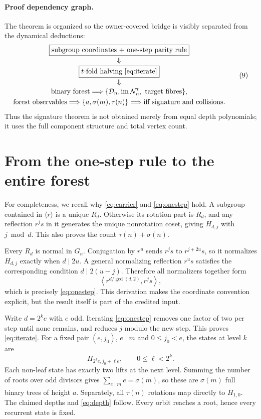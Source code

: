 \documentclass[10pt,a4paper]{amsart}
\theoremstyle{remark}
\newcommand{\im}{\operatorname{im}}
\begin{document}
\paragraph{Proof dependency graph.}
The theorem is organized so the owner-covered bridge is visibly separated
from the dynamical deductions:
\[
\begin{gathered}
\boxed{\text{subgroup coordinates + one-step parity rule}}\\[-1mm]
\Downarrow\\[-1mm]
\boxed{\text{\(t\)-fold halving \eqref{eq:iterate}}}\\[-1mm]
\Downarrow\\[-1mm]
\text{binary forest}\Longrightarrow
\{\mathcal D_n,\im\mathcal N_n^t,\text{ target fibres}\},\\
\text{forest observables}\Longrightarrow\{a,\sigma(m),\tau(n)\}
\Longrightarrow\text{iff signature and collisions}.
\end{gathered}                                         \tag{9}\label{eq:dependency}
\]
Thus the signature theorem is not obtained merely from equal depth
polynomials; it uses the full component structure and total vertex count.

\section{From the one-step rule to the entire forest}

For completeness, we recall why \eqref{eq:carrier} and \eqref{eq:onestep}
hold.  A subgroup contained in \(\langle r\rangle\) is a unique \(R_d\).
Otherwise its rotation part is \(R_d\), and any reflection \(r^js\) in it
generates the unique nonrotation coset, giving \(H_{d,j}\) with \(j\bmod d\).
This also proves the count \(\tau(n)+\sigma(n)\).

Every \(R_d\) is normal in \(G_n\).  Conjugation by \(r^u\) sends
\(r^js\) to \(r^{j+2u}s\), so it normalizes \(H_{d,j}\) exactly when
\(d\mid2u\).  A general normalizing reflection \(r^us\) satisfies the
corresponding condition \(d\mid2(u-j)\).  Therefore all normalizers together
form
\[
\left\langle r^{d/\gcd(d,2)},r^js\right\rangle,
\]
which is precisely \eqref{eq:onestep}.  This derivation makes the coordinate
convention explicit, but the result itself is part of the credited input.

Write \(d=2^ke\) with \(e\) odd.  Iterating \eqref{eq:onestep} removes one
factor of two per step until none remains, and reduces \(j\) modulo the new
step.  This proves \eqref{eq:iterate}.  For a fixed pair
\((e,j_0)\), \(e\mid m\) and \(0\leq j_0<e\), the states at level \(k\) are
\[
H_{2^ke,j_0+\ell e},\qquad0\leq\ell<2^k.              \tag{10}\label{eq:lifts}
\]
Each non-leaf state has exactly two lifts at the next level.  Summing the
number of roots over odd divisors gives
\(\sum_{e\mid m}e=\sigma(m)\), so these are
\(\sigma(m)\) full binary trees of height \(a\).  Separately, all
\(\tau(n)\) rotations map directly to \(H_{1,0}\).  The claimed depths and
\eqref{eq:depth} follow.  Every orbit reaches a root, hence every recurrent
state is fixed.
\end{document}
